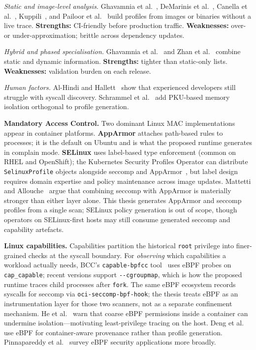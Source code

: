 \emph{Static and image-level analysis.} Ghavamnia et al.~\cite{ghavamnia2020confine}, DeMarinis et al.~\cite{demarinis2020sysfilter}, Canella et al.~\cite{canella2021}, Kuppili~\cite{kuppili2025dockergate}, and Pailoor et al.~\cite{pailoor2020abhaya} build profiles from images or binaries without a live trace. \textbf{Strengths:} CI-friendly before production traffic. \textbf{Weaknesses:} over- or under-approximation; brittle across dependency updates.

\emph{Hybrid and phased specialisation.} Ghavamnia et al.~\cite{ghavamnia2020temporal} and Zhan et al.~\cite{zhan2023sysverify} combine static and dynamic information. \textbf{Strengths:} tighter than static-only lists. \textbf{Weaknesses:} validation burden on each release.

\emph{Human factors.} Al-Hindi and Hallett~\cite{alhindi2025} show that experienced developers still struggle with syscall discovery. Schrammel et al.~\cite{schrammel2022} add PKU-based memory isolation orthogonal to profile generation.

\textbf{Mandatory Access Control.} Two dominant Linux MAC implementations appear in container platforms. \textbf{AppArmor} attaches path-based rules to processes; it is the default on Ubuntu and is what the proposed runtime generates in complain mode. \textbf{SELinux} uses label-based type enforcement (common on RHEL and OpenShift); the Kubernetes Security Profiles Operator can distribute \texttt{SelinuxProfile} objects alongside seccomp and AppArmor~\cite{spo2025}, but label design requires domain expertise and policy maintenance across image updates. Mattetti and Allouche~\cite{mattetti2020} argue that combining seccomp with AppArmor is materially stronger than either layer alone. This thesis generates AppArmor and seccomp profiles from a single scan; SELinux policy generation is out of scope, though operators on SELinux-first hosts may still consume generated seccomp and capability artefacts.

\textbf{Linux capabilities.} Capabilities partition the historical \texttt{root} privilege into finer-grained checks at the syscall boundary. For \emph{observing} which capabilities a workload actually needs, BCC's \texttt{capable-bpfcc} tool~\cite{bcc2025} uses eBPF probes on \texttt{cap\_capable}; recent versions support \texttt{-{}-cgroupmap}, which is how the proposed runtime traces child processes after \texttt{fork}. The same eBPF ecosystem records syscalls for seccomp via \texttt{oci-seccomp-bpf-hook}; the thesis treats eBPF as an instrumentation layer for those two scanners, not as a separate confinement mechanism. He et al.~\cite{he2023crosscontainer} warn that coarse eBPF permissions inside a container can undermine isolation---motivating least-privilege tracing on the host. Deng et al.~\cite{deng2024conprov} use eBPF for container-aware provenance rather than profile generation. Pinnapareddy et al.~\cite{pinnapareddy2025} survey eBPF security applications more broadly.

